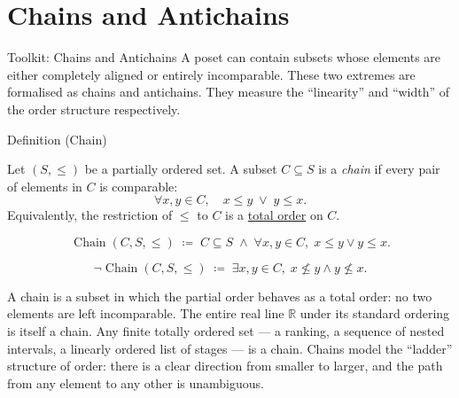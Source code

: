 
\section{Chains and Antichains}
\label{sec:chains-antichains}

\begin{toolkitbox}{Toolkit: Chains and Antichains}
A poset can contain subsets whose elements are either completely aligned
or entirely incomparable.  These two extremes are formalised as chains and
antichains.  They measure the ``linearity'' and ``width'' of the order
structure respectively.
\end{toolkitbox}


\begin{definitionbox}{Definition (Chain)}
\begin{definition}[Chain]
\label{def:chain}
Let $(S, \leq)$ be a partially ordered set.  A subset $C \subseteq S$ is a
\emph{chain} if every pair of elements in $C$ is comparable:
\[
\forall x, y \in C, \quad x \leq y \;\lor\; y \leq x.
\]
Equivalently, the restriction of $\leq$ to $C$ is a
\hyperref[def:lattice-order-total-order]{total order} on $C$.
\end{definition}
\end{definitionbox}

\begin{remark*}
\[
\operatorname{Chain}(C, S, \leq)
\;\coloneqq\;
C \subseteq S
\;\land\;
\forall x, y \in C,\; x \leq y \lor y \leq x.
\]
\end{remark*}

\begin{remark*}
\[
\neg\operatorname{Chain}(C, S, \leq)
\;\coloneqq\;
\exists x, y \in C,\; x \not\leq y \land y \not\leq x.
\]
\end{remark*}

\begin{remark*}[Interpretation]
A chain is a subset in which the partial order behaves as a total order:
no two elements are left incomparable.  The entire real line $\mathbb{R}$
under its standard ordering is itself a chain.  Any finite totally ordered
set — a ranking, a sequence of nested intervals, a linearly ordered list
of stages — is a chain.  Chains model the ``ladder'' structure of order:
there is a clear direction from smaller to larger, and the path from any
element to any other is unambiguous.
\end{remark*}

